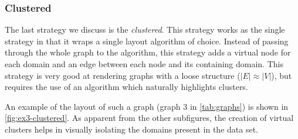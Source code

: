 \subsubsection{Clustered}

The last strategy we discuss is the \emph{clustered}. This strategy works as the single strategy in that it wraps a single layout algorithm of choice. Instead of passing through the whole graph to the algorithm, this strategy adds a virtual node for each domain and an edge between each node and its containing domain. This strategy is very good at rendering graphs with a loose structure ($|E| \approx |V|$), but requires the use of an algorithm which naturally highlights clusters.

An example of the layout of such a graph (graph 3 in \ref{tab:graphs}) is shown in \vref{fig:ex3-clustered}. As apparent from the other subfigures, the creation of virtual clusters helps in visually isolating the domains present in the data set.

